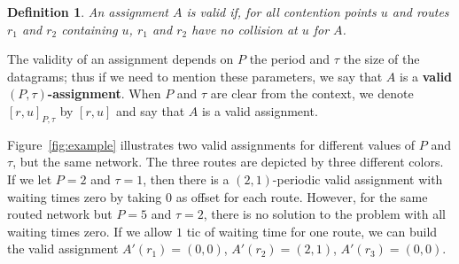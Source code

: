 \documentclass[a4paper,10pt]{journal}
\newtheorem{definition}{Definition}
\begin{document}
    \begin{definition}
    An assignment $A$ is valid if, for all contention points $u$ and routes $r_1$ and $r_2$ containing $u$, $r_1$ and $r_2$ have no collision at $u$ for $A$. 
    \end{definition}

    The validity of an assignment depends on $P$ the period and $\tau$ the size of the datagrams; thus if we need to mention these parameters, we say that $A$ is a \textbf{valid $(P,\tau)$-assignment}. When $P$ and $\tau$ are clear from the context, we denote $[r,u]_{P,\tau}$ by $[r,u]$ and say that $A$ is a valid assignment. 

\begin{examplee}

    Figure~\ref{fig:example} illustrates two valid assignments for different values of $P$ and $\tau$, but the same network. The three routes are depicted by three different colors. If we let $P = 2$ and $\tau = 1$, then there is a $(2,1)$-periodic valid assignment with waiting times zero by taking $0$ as offset for each route. However, for the same routed network but $P=5$ and $\tau = 2$, there is no solution to the problem with all waiting times zero. If we allow $1$ tic of waiting time for one route, we can build the valid assignment $A'(r_1) = (0,0)$, $A'(r_2) = (2,1)$, $A'(r_3)= (0,0)$.

\end{examplee}
  
\end{document}
